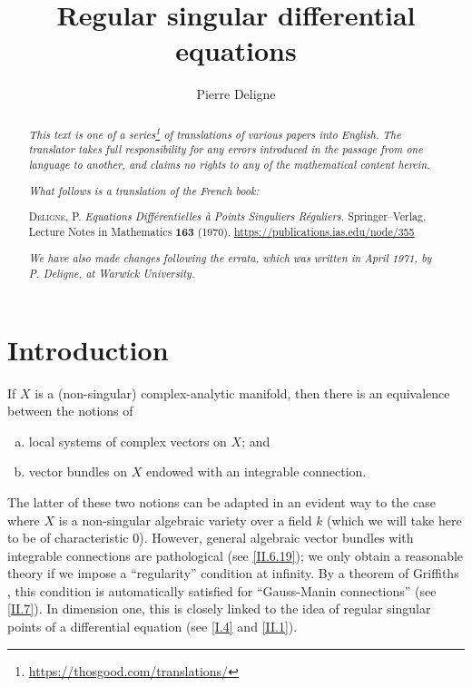 \documentclass{report}
\title{Regular singular differential equations}
\author{Pierre Deligne}
\date{}
\theoremstyle{plain}
\theoremstyle{definition}
\newcommand{\oldpage}[1]{\marginpar{\footnotesize$\Big\vert$ \textit{p.~#1}}}
\begin{document}
\maketitle

\renewcommand{\abstractname}{Translator's note.}

\begin{abstract}
  \renewcommand*{\thefootnote}{\fnsymbol{footnote}}
  \emph{This text is one of a series\footnote{\url{https://thosgood.com/translations/}} of translations of various papers into English.}
  \emph{The translator takes full responsibility for any errors introduced in the passage from one language to another, and claims no rights to any of the mathematical content herein.}

  \medskip
  
  \emph{What follows is a translation of the French book:}

  \medskip\noindent
  \textsc{Deligne, P.}
  \emph{Equations Diff\'{e}rentielles \`{a} Points Singuliers R\'{e}guliers.}
  Springer--Verlag, Lecture Notes in Mathematics \textbf{163} (1970).
  {\footnotesize\url{https://publications.ias.edu/node/355}}

  \medskip
  \noindent\emph{We have also made changes following the errata, which was written in April 1971, by P. Deligne, at Warwick University.}
\end{abstract}

\setcounter{footnote}{0}

\tableofcontents




\setcounter{chapter}{-1}

\chapter{Introduction}
\label{0}

\oldpage{1}
If $X$ is a (non-singular) complex-analytic manifold, then there is an equivalence between the notions of
\begin{enumerate}[a)]
  \item local systems of complex vectors on $X$; and
  \item vector bundles on $X$ endowed with an integrable connection.
\end{enumerate}

The latter of these two notions can be adapted in an evident way to the case where $X$ is a non-singular algebraic variety over a field $k$ (which we will take here to be of characteristic $0$).
However, general algebraic vector bundles with integrable connections are pathological (see \cref{II.6.19});
we only obtain a reasonable theory if we impose a ``regularity'' condition at infinity.
By a theorem of Griffiths \cite{8}, this condition is automatically satisfied for ``Gauss-Manin connections'' (see \cref{II.7}).
In dimension one, this is closely linked to the idea of regular singular points of a differential equation (see \cref{I.4} and \cref{II.1}).
\end{document}
